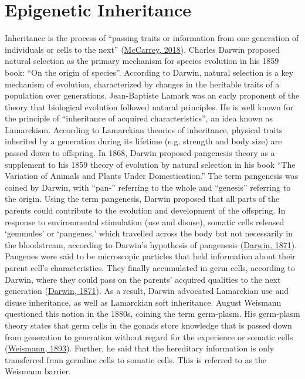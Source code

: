\documentclass[12pt,twoside]{reedthesis}
\begin{document}
\hypertarget{epigenetic-inheritance}{%
\section*{Epigenetic Inheritance}\label{epigenetic-inheritance}}

Inheritance is the process of ``passing traits or information from one
generation of individuals or cells to the next'' (\protect\hyperlink{ref-mccarrey2018}{McCarrey, 2018}). Charles
Darwin proposed natural selection as the primary mechanism for species
evolution in his 1859 book: ``On the origin of species''. According to
Darwin, natural selection is a key mechanism of evolution, characterized
by changes in the heritable traits of a population over generations.
Jean-Baptiste Lamark was an early proponent of the theory that
biological evolution followed natural principles. He is well known for
the principle of ``inheritance of acquired characteristics'', an idea
known as Lamarckism. According to Lamarckian theories of inheritance,
physical traits inherited by a generation during its lifetime (e.g.
strength and body size) are passed down to offspring. In 1868, Darwin
proposed pangenesis theory as a supplement to his 1859 theory of
evolution by natural selection in his book ``The Variation of Animals and
Plants Under Domestication.'' The term pangenesis was coined by Darwin,
with ``pan-'' referring to the whole and ``genesis'' referring to the
origin. Using the term pangenesis, Darwin proposed that all parts of the
parents could contribute to the evolution and development of the
offspring. In response to environmental stimulation (use and disuse),
somatic cells released `gemmules' or `pangenes,' which travelled across
the body but not necessarily in the bloodstream, according to Darwin's
hypothesis of pangenesis (\protect\hyperlink{ref-darwin1871}{Darwin, 1871}). Pangenes were said to be
microscopic particles that held information about their parent cell's
characteristics. They finally accumulated in germ cells, according to
Darwin, where they could pass on the parents' acquired qualities to the
next generation (\protect\hyperlink{ref-darwin1871}{Darwin, 1871}). As a result, Darwin advocated Lamarckian
use and disuse inheritance, as well as Lamarckian soft inheritance.
August Weismann questioned this notion in the 1880s, coining the term
germ-plasm. His germ-plasm theory states that germ cells in the gonads
store knowledge that is passed down from generation to generation
without regard for the experience or somatic cells (\protect\hyperlink{ref-weismann1893}{Weismann, 1893}).
Further, he said that the hereditary information is only transferred
from germline cells to somatic cells. This is referred to as the
Weismann barrier.
\end{document}
